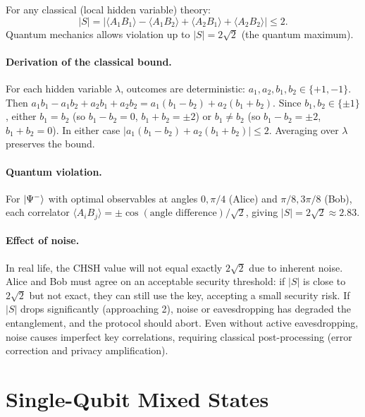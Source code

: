 \documentclass[10pt,a4paper]{article}
\begin{document}
\begin{tcolorbox}[propstyle, title={CHSH Inequality}]
For any classical (local hidden variable) theory:
\[
|S|=|\langle A_1B_1\rangle-\langle A_1B_2\rangle+\langle A_2B_1\rangle+\langle A_2B_2\rangle|\le 2.
\]
Quantum mechanics allows violation up to $|S|=2\sqrt{2}$ (the quantum maximum).

\paragraph{Derivation of the classical bound.} For each hidden variable $\lambda$, outcomes are deterministic: $a_1,a_2,b_1,b_2\in\{+1,-1\}$. Then $a_1b_1-a_1b_2+a_2b_1+a_2b_2=a_1(b_1-b_2)+a_2(b_1+b_2)$. Since $b_1,b_2\in\{\pm 1\}$, either $b_1=b_2$ (so $b_1-b_2=0$, $b_1+b_2=\pm 2$) or $b_1\neq b_2$ (so $b_1-b_2=\pm 2$, $b_1+b_2=0$). In either case $|a_1(b_1-b_2)+a_2(b_1+b_2)|\le 2$. Averaging over $\lambda$ preserves the bound.

\paragraph{Quantum violation.} For $\ket{\Psi^-}$ with optimal observables at angles $0,\pi/4$ (Alice) and $\pi/8,3\pi/8$ (Bob), each correlator $\langle A_iB_j\rangle=\pm\cos(\text{angle difference})/\sqrt{2}$, giving $|S|=2\sqrt{2}\approx 2.83$.
\end{tcolorbox}

\paragraph{Effect of noise.} In real life, the CHSH value will not equal exactly $2\sqrt{2}$ due to inherent noise. Alice and Bob must agree on an acceptable security threshold: if $|S|$ is close to $2\sqrt{2}$ but not exact, they can still use the key, accepting a small security risk. If $|S|$ drops significantly (approaching 2), noise or eavesdropping has degraded the entanglement, and the protocol should abort. Even without active eavesdropping, noise causes imperfect key correlations, requiring classical post-processing (error correction and privacy amplification).

\section{Single-Qubit Mixed States}
\end{document}
